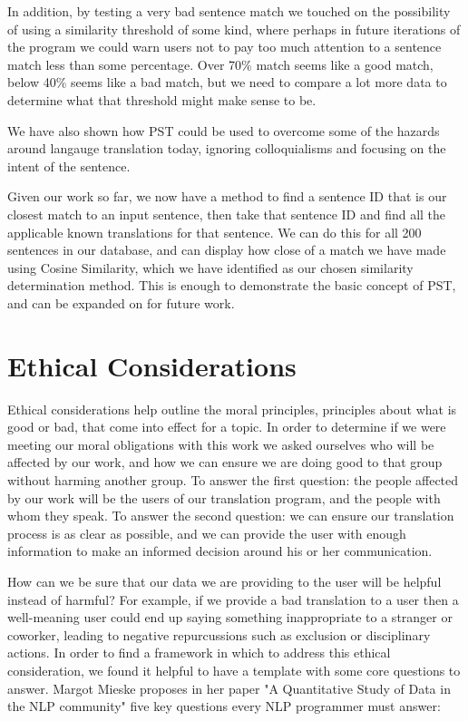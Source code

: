 \documentclass[runningheads]{llncs}
\begin{document}
	In addition, by testing a very bad sentence match we touched on the possibility of using a similarity threshold of some kind, where perhaps in future iterations of the program we could warn users not to pay too much attention to a sentence match less than some percentage. Over 70\% match seems like a good match, below 40\% seems like a bad match, but we need to compare a lot more data to determine what that threshold might make sense to be.

	We have also shown how PST could be used to overcome some of the hazards around langauge translation today, ignoring colloquialisms and focusing on the intent of the sentence.

	Given our work so far, we now have a method to find a sentence ID that is our closest match to an input sentence, then take that sentence ID and find all the applicable known translations for that sentence. We can do this for all 200 sentences in our database, and can display how close of a match we have made using Cosine Similarity, which we have identified as our chosen similarity determination method. This is enough to demonstrate the basic concept of PST, and can be expanded on for future work.

	\section{Ethical Considerations}
	Ethical considerations help outline the moral principles, principles about what is good or bad, that come into effect for a topic. In order to determine if we were meeting our moral obligations with this work we asked ourselves who will be affected by our work, and how we can ensure we are doing good to that group without harming another group. To answer the first question: the people affected by our work will be the users of our translation program, and the people with whom they speak. To answer the second question: we can ensure our translation process is as clear as possible, and we can provide the user with enough information to make an informed decision around his or her communication. 

	How can we be sure that our data we are providing to the user will be helpful instead of harmful? For example, if we provide a bad translation to a user then a well-meaning user could end up saying something inappropriate to a stranger or coworker, leading to negative repurcussions such as exclusion or disciplinary actions. In order to find a framework in which to address this ethical consideration, we found it helpful to have a template with some core questions to answer. Margot Mieske proposes in her paper "A Quantitative Study of Data in the NLP community" five key questions every NLP programmer must answer: ~\cite{ref_url8}
\end{document}

